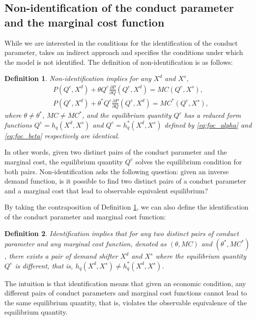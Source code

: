 \documentclass[11pt, a4paper]{article}
\newtheorem{definition}{Definition}
\theoremstyle{remark}
\begin{document}
\subsection{Non-identification of the conduct parameter and the marginal cost function}\label{sec:definition_identification}
While we are interested in the conditions for the identification of the conduct parameter, \citet{lau1982identifying} takes an indirect approach and specifies the conditions under which the model is not identified.
The definition of non-identification is as follows:
\begin{definition}\label{definition:non_identification}
    Non-identification implies for any $X^{d}$ and $X^{s}$,
    \begin{align}
    & P(Q^e, X^{d}) + \theta Q^e\frac{\partial P}{\partial Q}(Q^e, X^{d}) = MC(Q^e, X^{s}) ,  \label{eq:foc_alpha}\\
    & P(Q^e, X^{d}) + \theta^{*} Q^e\frac{\partial P}{\partial Q}(Q^e, X^{d}) = MC^{*}(Q^e, X^{s}),\label{eq:foc_beta}
    \end{align}
    where $\theta \neq \theta^{*}$, $MC \ne MC^{*}$, and the equilibrium quantity $Q^e$ has a reduced form functions $Q^e = h_q(X^{d}, X^{s})$ and $Q^e = h_q^{*}(X^{d}, X^{s})$ defined by \eqref{eq:foc_alpha} and \eqref{eq:foc_beta} respectively are identical.
\end{definition}
In other words, given two distinct pairs of the conduct parameter and the marginal cost, the equilibrium quantity $Q^e$ solves the equilibrium condition for both pairs.
Non-identification asks the following question: given an inverse demand function, is it possible to find two distinct pairs of a conduct parameter and a marginal cost that lead to observable equivalent equilibrium?


By taking the contraposition of Definition \ref{definition:non_identification}, we can also define the identification of the conduct parameter and marginal cost function:
\begin{definition}\label{definition:identification}
    Identification implies that for any two distinct pairs of conduct parameter and any marginal cost function, denoted as $(\theta, MC)$ and $(\theta^{*}, MC^{*})$, there exists a pair of demand shifter $X^{d}$ and $X^{s}$ where the equilibrium quantity $Q^e$ is different, that is, $h_q(X^{d}, X^{s}) \ne h_q^{*}(X^{d}, X^{s})$.
\end{definition}
The intuition is that identification means that given an economic condition, any different pairs of conduct parameters and marginal cost functions cannot lead to the same equilibrium quantity, that is, violates the observable equivalence of the equilibrium quantity.
\end{document}
